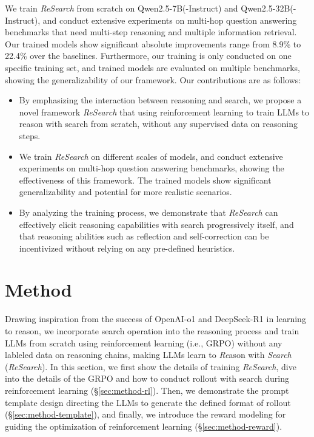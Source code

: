 \documentclass{article}
\begin{document}
We train \textit{ReSearch} from scratch on Qwen2.5-7B(-Instruct) and Qwen2.5-32B(-Instruct), and conduct extensive experiments on multi-hop question answering benchmarks that need multi-step reasoning and multiple information retrieval. Our trained models show significant absolute improvements range from 8.9\% to 22.4\% over the baselines.
Furthermore, our training is only conducted on one specific training set, and trained models are evaluated on multiple benchmarks, showing the generalizability of our framework.
Our contributions are as follows:
\begin{itemize}[leftmargin=*]
  \item By emphasizing the interaction between reasoning and search, we propose a novel framework \textit{ReSearch} that using reinforcement learning to train LLMs to reason with search from scratch, without any supervised data on reasoning steps.
  \item We train \textit{ReSearch} on different scales of models, and conduct extensive experiments on multi-hop question answering benchmarks, showing the effectiveness of this framework. The trained models show significant generalizability and potential for more realistic scenarios.
  \item By analyzing the training process, we demonstrate that \textit{ReSearch} can effectively elicit reasoning capabilities with search progressively itself, and that reasoning abilities such as reflection and self-correction can be incentivized without relying on any pre-defined heuristics.
\end{itemize}

\section{Method}

Drawing inspiration from the success of OpenAI-o1 and DeepSeek-R1 in learning to reason, we incorporate search operation into the reasoning process and train LLMs from scratch using reinforcement learning (i.e., GRPO) without any lableled data on reasoning chains, making LLMs learn to \textit{Re}ason with \textit{Search} (\textit{ReSearch}).
In this section, we first show the details of training \textit{ReSearch}, dive into the details of the GRPO and how to conduct rollout with search during reinforcement learning (\S \ref{sec:method-rl}). 
Then, we demonstrate the prompt template design directing the LLMs to generate the defined format of rollout (\S \ref{sec:method-template}), and finally, we introduce the reward modeling for guiding the optimization of reinforcement learning (\S \ref{sec:method-reward}).
\end{document}
